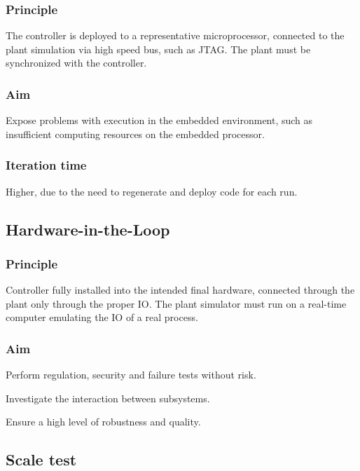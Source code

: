 \documentclass[a4paper,twoside,english]{report}
\begin{document}
\subsubsection{Principle}

The controller is deployed to a representative microprocessor, connected
to the plant simulation via high speed bus, such as JTAG. The plant
must be synchronized with the controller.

\subsubsection{Aim}

Expose problems with execution in the embedded environment, such as
insufficient computing resources on the embedded processor.

\subsubsection{Iteration time}

Higher, due to the need to regenerate and deploy code for each run.

\subsection{Hardware-in-the-Loop}

\subsubsection{Principle}

Controller fully installed into the intended final hardware, connected
through the plant only through the proper IO. The plant simulator
must run on a real-time computer emulating the IO of a real process.

\subsubsection{Aim}

Perform regulation, security and failure tests without risk.

Investigate the interaction between subsystems.

Ensure a high level of robustness and quality.

\subsection{Scale test}
\end{document}
